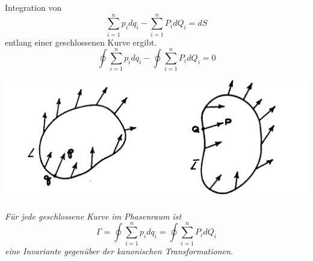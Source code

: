 \begin{frame}
    Integration von
    \begin{displaymath}
    \sum_{i=1}^{n} p_i d q_i - \sum_{i=1}^{n} P_i d Q_i = d S
    \end{displaymath}
    entlang einer geschlossenen Kurve ergibt.
   \begin{displaymath}
   \oint \sum_{i=1}^{n} p_i d q_i - \oint \sum_{i=1}^{n} P_i d Q_i = 0
   \end{displaymath}
    \begin{center} \includegraphics[scale=0.225]{images/circulation}  \end{center}  

\end{frame}

\begin{frame}
     \emph{Für jede geschlossene Kurve im Phasenraum ist}
    \begin{displaymath}
    \Gamma = \oint \sum_{i=1}^{n} p_i d q_i = \oint \sum_{i=1}^{n} P_i d Q_i
    \end{displaymath}
     \emph{eine Invariante gegenüber der kanonischen Transformationen.}
 
\end{frame}